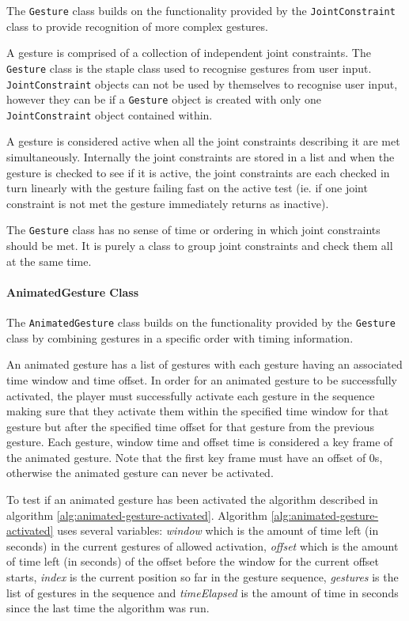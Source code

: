 \documentclass[a4paper,oneside]{memoir}
\begin{document}
					The \texttt{Gesture} class builds on the functionality provided by the \texttt{JointConstraint} class to provide recognition of more complex gestures.

					A gesture is comprised of a collection of independent joint constraints.
					The \texttt{Gesture} class is the staple class used to recognise gestures from user input.
					\texttt{JointConstraint} objects can not be used by themselves to recognise user input, however they can be if a \texttt{Gesture} object is created with only one \texttt{JointConstraint} object contained within.  

					A gesture is considered active when all the joint constraints describing it are met simultaneously.
					Internally the joint constraints are stored in a list and when the gesture is checked to see if it is active, the joint constraints are each checked in turn linearly with the gesture failing fast on the active test (ie. if one joint constraint is not met the gesture immediately returns as inactive).

					The \texttt{Gesture} class has no sense of time or ordering in which joint constraints should be met.
					It is purely a class to group joint constraints and check them all at the same time.

				\paragraph{AnimatedGesture Class}

					The \texttt{AnimatedGesture} class builds on the functionality provided by the \texttt{Gesture} class by combining gestures in a specific order with timing information.

					An animated gesture has a list of gestures with each gesture having an associated time window and time offset.
					In order for an animated gesture to be successfully activated, the player must successfully activate each gesture in the sequence making sure that they activate them within the specified time window for that gesture but after the specified time offset for that gesture from the previous gesture.
					Each gesture, window time and offset time is considered a key frame of the animated gesture.
					Note that the first key frame must have an offset of 0s, otherwise the animated gesture can never be activated.

					To test if an animated gesture has been activated the algorithm described in algorithm \ref{alg:animated-gesture-activated}.
					Algorithm \ref{alg:animated-gesture-activated} uses several variables: \emph{window} which is the amount of time left (in seconds) in the current gestures of allowed activation, \emph{offset} which is the amount of time left (in seconds) of the offset before the window for the current offset starts, \emph{index} is the current position so far in the gesture sequence, \emph{gestures} is the list of gestures in the sequence and \emph{timeElapsed} is the amount of time in seconds since the last time the algorithm was run.
					
\end{document}
